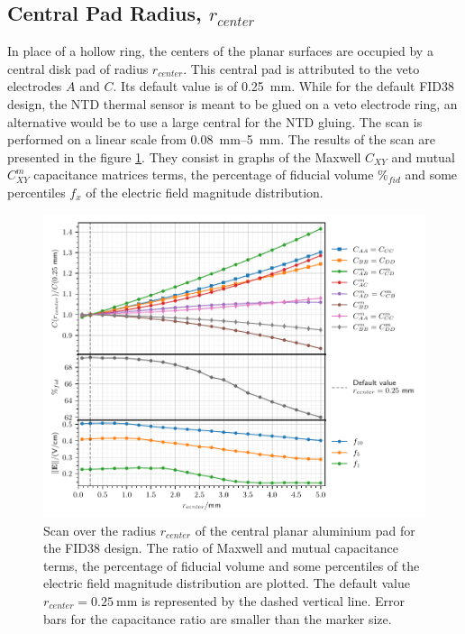 \subsection{Central Pad Radius, $r_{center}$}

In place of a hollow ring, the centers of the planar surfaces are occupied by a central disk pad of radius $r_{center}$. This central pad is attributed to the veto electrodes $A$ and $C$. Its default value is of \SI{0.25}{\mm}. While for the default FID38 design, the NTD thermal sensor is meant to be glued on a veto electrode ring, an alternative would be to use a large central for the NTD gluing. The scan is performed on a linear scale from \SIrange{0.08}{5}{\mm}. The results of the scan are presented in the figure \ref{fig:capacitance-fiducial-r-center}. They consist in graphs of the Maxwell $C_{XY}$ and mutual $C_{XY}^m$ capacitance matrices terms, the percentage of fiducial volume $\%_{fid}$ and some percentiles $f_x$ of the electric field magnitude distribution.

\begin{figure}
\centering
\includegraphics[scale=1]{Figures/ElectrodesScan/capacitance_fiducial_r_center.pdf}
\caption{Scan over the radius $r_{center}$ of the central planar aluminium pad for the FID38 design. The ratio of Maxwell and mutual capacitance terms, the percentage of fiducial volume and some percentiles of the electric field magnitude distribution are plotted. The default value $r_{center}=\SI{0.25}{\mm}$ is represented by the dashed vertical line. Error bars for the capacitance ratio are smaller than the marker size.}
\label{fig:capacitance-fiducial-r-center}
\end{figure}

